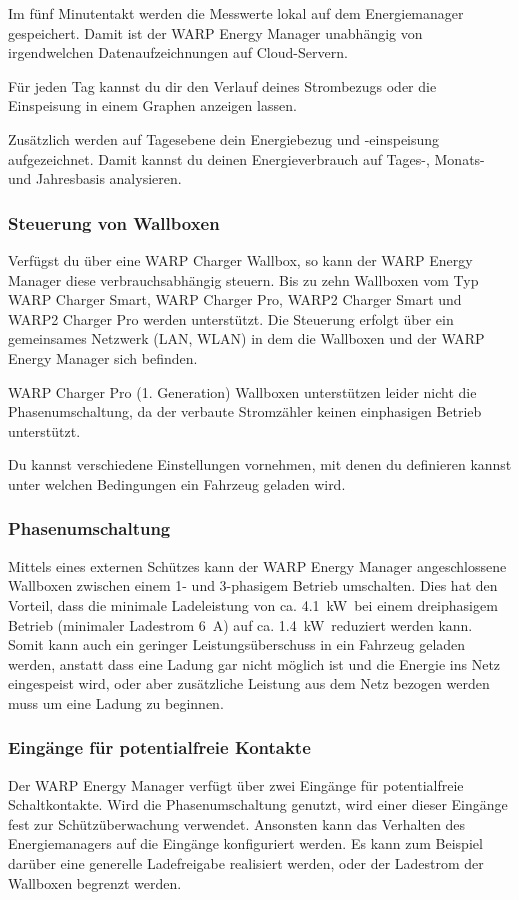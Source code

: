 \documentclass[a4paper,10pt]{article}
\newcommand{\hint}[1]{\begin{tcolorbox}[colback=boxgray,colframe=black,coltext=
white,title=Hinweis,left*=2mm,right*=2mm,boxsep=1mm,bottom=1mm,top=1mm]#1\end{tcolorbox}}
\begin{document}
\begin{multicols*}{2}
	Im fünf Minutentakt werden die Messwerte lokal auf dem 
	Energiemanager gespeichert. Damit ist der WARP Energy Manager unabhängig 
	von irgendwelchen Datenaufzeichnungen auf Cloud-Servern.

	Für jeden Tag kannst du dir den Verlauf deines Strombezugs oder die
	Einspeisung in einem Graphen anzeigen lassen.

	Zusätzlich werden auf Tagesebene dein Energiebezug und -einspeisung
	aufgezeichnet. Damit kannst du deinen Energieverbrauch auf Tages-, Monats- und
	Jahresbasis analysieren.

	\subsubsection{Steuerung von Wallboxen}
	Verfügst du über eine WARP Charger Wallbox, so kann der WARP Energy Manager
	diese verbrauchsabhängig steuern. Bis zu zehn Wallboxen vom Typ WARP Charger Smart, 
	WARP Charger Pro, WARP2 Charger Smart und WARP2 Charger Pro werden unterstützt. Die
	Steuerung erfolgt über ein gemeinsames Netzwerk (LAN, WLAN) in dem die
	Wallboxen und der WARP Energy Manager sich befinden.

	\hint{WARP Charger Pro (1. Generation) Wallboxen unterstützen leider nicht die
	Phasenumschaltung, da der verbaute Stromzähler keinen einphasigen Betrieb
	unterstützt.}

	Du kannst verschiedene Einstellungen vornehmen, mit denen du definieren
	kannst unter welchen Bedingungen ein Fahrzeug geladen wird.

	\subsubsection{Phasenumschaltung}
	Mittels eines externen Schützes kann der WARP Energy Manager
	angeschlossene Wallboxen zwischen einem 1- und 3-phasigem Betrieb
	umschalten. 
	Dies hat den Vorteil, dass die minimale Ladeleistung von ca.
	\SI{4.1}{\kilo\watt}~bei einem dreiphasigem Betrieb (minimaler Ladestrom
	\SI{6}{\ampere}) auf ca. \SI{1.4}{\kilo\watt}~reduziert werden kann. Somit
	kann auch ein geringer Leistungsüberschuss in ein Fahrzeug geladen werden,
	anstatt dass eine Ladung gar nicht möglich ist und die Energie ins Netz 
	eingespeist wird, oder aber zusätzliche Leistung aus dem Netz bezogen werden 
	muss um eine Ladung zu beginnen.

	\subsubsection{Eingänge für potentialfreie Kontakte}
	Der WARP Energy Manager verfügt über zwei Eingänge für potentialfreie
	Schaltkontakte. Wird die Phasenumschaltung genutzt, wird einer dieser
	Eingänge fest zur Schützüberwachung verwendet. Ansonsten kann das Verhalten
	des Energiemanagers auf die Eingänge konfiguriert werden. Es kann zum
	Beispiel darüber eine generelle Ladefreigabe realisiert werden, oder der
	Ladestrom der Wallboxen begrenzt werden.


\end{multicols*}
\end{document}
